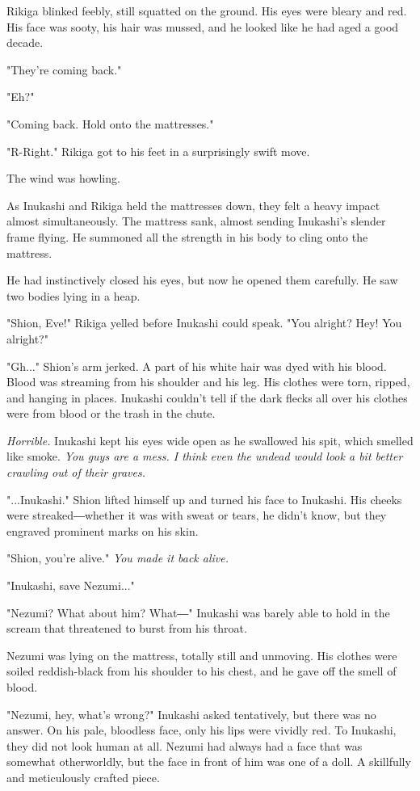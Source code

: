 Rikiga blinked feebly, still squatted on the ground. His eyes were
bleary and red. His face was sooty, his hair was mussed, and he looked
like he had aged a good decade.

"They're coming back."

"Eh?"

"Coming back. Hold onto the mattresses."

"R-Right." Rikiga got to his feet in a surprisingly swift move.

The wind was howling.

As Inukashi and Rikiga held the mattresses down, they felt a heavy
impact almost simultaneously. The mattress sank, almost sending
Inukashi's slender frame flying. He summoned all the strength in his
body to cling onto the mattress.

He had instinctively closed his eyes, but now he opened them carefully.
He saw two bodies lying in a heap.

"Shion, Eve!" Rikiga yelled before Inukashi could speak. "You alright?
Hey! You alright?"

"Gh..." Shion's arm jerked. A part of his white hair was dyed with his
blood. Blood was streaming from his shoulder and his leg. His clothes
were torn, ripped, and hanging in places. Inukashi couldn't tell if the
dark flecks all over his clothes were from blood or the trash in the
chute.

\emph{Horrible.} Inukashi kept his eyes wide open as he swallowed his spit,
which smelled like smoke. \emph{You guys are a mess. I think even the undead
would look a bit better crawling out of their graves.}

"...Inukashi." Shion lifted himself up and turned his face to Inukashi.
His cheeks were streaked―whether it was with sweat or tears, he didn't
know, but they engraved prominent marks on his skin.

"Shion, you're alive." \emph{You made it back alive.}

"Inukashi, save Nezumi..."

"Nezumi? What about him? What―" Inukashi was barely able to hold in the
scream that threatened to burst from his throat.

Nezumi was lying on the mattress, totally still and unmoving. His
clothes were soiled reddish-black from his shoulder to his chest, and he
gave off the smell of blood.

"Nezumi, hey, what's wrong?" Inukashi asked tentatively, but there was
no answer. On his pale, bloodless face, only his lips were vividly red.
To Inukashi, they did not look human at all. Nezumi had always had a
face that was somewhat otherworldly, but the face in front of him was
one of a doll. A skillfully and meticulously crafted piece.

